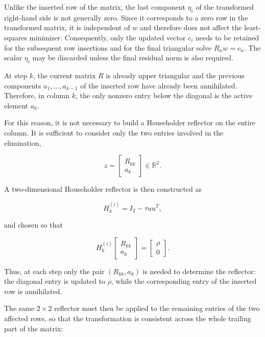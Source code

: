 \documentclass[11pt,a4paper]{article}
\newcommand{\R}{\mathbb{R}}
\begin{document}
Unlike the inserted row of the matrix, the last component $\eta_i$ of the transformed right-hand side is not generally zero. Since it corresponds to a zero row in the transformed matrix, it is independent of $w$ and therefore does not affect the least-squares minimizer. Consequently, only the updated vector $c_i$ needs to be retained for the subsequent row insertions and for the final triangular solve $R_n w = c_n$. The scalar $\eta_i$ may be discarded unless the final residual norm is also required.

At step $k$, the current matrix $R$ is already upper triangular and the
previous components $a_1,\ldots,a_{k-1}$ of the inserted row have already
been annihilated. Therefore, in column $k$, the only nonzero entry below the
diagonal is the active element $a_k$.

For this reason, it is not necessary to build a Householder reflector on the
entire column. It is sufficient to consider only the two entries involved in
the elimination,

\begin{equation}
    z =
    \begin{bmatrix}
        R_{kk} \\
        a_k
    \end{bmatrix}
    \in \R^2.
\end{equation}

A two-dimensional Householder reflector is then constructed as

\begin{equation}
    H_k^{(i)} = I_2 - \tau u u^T,
\end{equation}

and chosen so that

\begin{equation}
    H_k^{(i)}
    \begin{bmatrix}
        R_{kk} \\
        a_k
    \end{bmatrix}
    =
    \begin{bmatrix}
        \rho \\
        0
    \end{bmatrix}.
\end{equation}

Thus, at each step only the pair $(R_{kk},a_k)$ is needed to determine the
reflector: the diagonal entry is updated to $\rho$, while the corresponding
entry of the inserted row is annihilated.

The same $2\times2$ reflector must then be applied to the remaining entries
of the two affected rows, so that the transformation is consistent across
the whole trailing part of the matrix:
\end{document}
